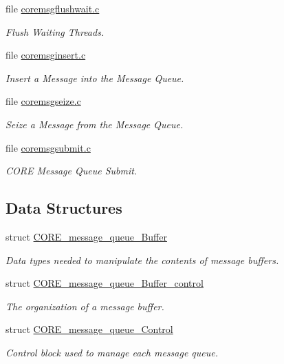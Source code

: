 \begin{DoxyCompactItemize}
file \mbox{\hyperlink{coremsgflushwait_8c}{coremsgflushwait.\+c}}
\begin{DoxyCompactList}\small\item\em Flush Waiting Threads. \end{DoxyCompactList}\item 
file \mbox{\hyperlink{coremsginsert_8c}{coremsginsert.\+c}}
\begin{DoxyCompactList}\small\item\em Insert a Message into the Message Queue. \end{DoxyCompactList}\item 
file \mbox{\hyperlink{coremsgseize_8c}{coremsgseize.\+c}}
\begin{DoxyCompactList}\small\item\em Seize a Message from the Message Queue. \end{DoxyCompactList}\item 
file \mbox{\hyperlink{coremsgsubmit_8c}{coremsgsubmit.\+c}}
\begin{DoxyCompactList}\small\item\em C\+O\+RE Message Queue Submit. \end{DoxyCompactList}\end{DoxyCompactItemize}
\subsection*{Data Structures}
\begin{DoxyCompactItemize}
\item 
struct \mbox{\hyperlink{structCORE__message__queue__Buffer}{C\+O\+R\+E\+\_\+message\+\_\+queue\+\_\+\+Buffer}}
\begin{DoxyCompactList}\small\item\em Data types needed to manipulate the contents of message buffers. \end{DoxyCompactList}\item 
struct \mbox{\hyperlink{structCORE__message__queue__Buffer__control}{C\+O\+R\+E\+\_\+message\+\_\+queue\+\_\+\+Buffer\+\_\+control}}
\begin{DoxyCompactList}\small\item\em The organization of a message buffer. \end{DoxyCompactList}\item 
struct \mbox{\hyperlink{structCORE__message__queue__Control}{C\+O\+R\+E\+\_\+message\+\_\+queue\+\_\+\+Control}}
\begin{DoxyCompactList}\small\item\em Control block used to manage each message queue. \end{DoxyCompactList}\end{DoxyCompactItemize}
